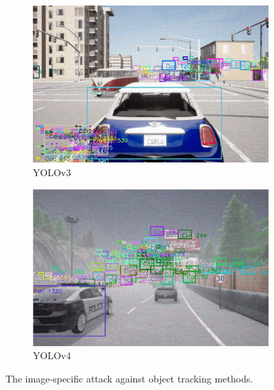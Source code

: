 \begin{figure}[H]
    \centering
    \begin{subfigure}[b]{0.48\textwidth}
        \centering
        \includegraphics[width=\linewidth]{figures/chapter_tracking/yolov3.png}
        \caption{YOLOv3}
        \label{fig:tracking_demo_yolov3} 
    \end{subfigure}
    \begin{subfigure}[b]{0.48\textwidth}
        \centering
        \includegraphics[width=\linewidth]{figures/chapter_tracking/yolov4.png}
        \caption{YOLOv4}
        \label{fig:tracking_demo_yolov4}
    \end{subfigure}
  \caption{The image-specific attack against object tracking methods.}
  \label{fig:tracking_attack}
\end{figure}

\clearpage

